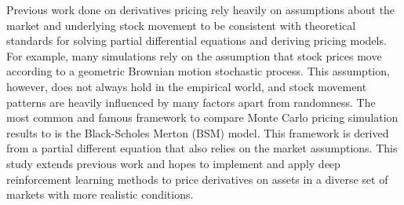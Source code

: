 % 
% 
%
Previous work done on derivatives pricing rely heavily on assumptions about the market and underlying stock movement to be consistent with theoretical standards for solving partial differential equations and deriving pricing models. For example, many simulations rely on the assumption that stock prices move according to a geometric Brownian motion stochastic process. This assumption, however, does not always hold in the empirical world, and stock movement patterns are heavily influenced by many factors apart from randomness. The most common and famous framework to compare Monte Carlo pricing simulation results to is the Black-Scholes Merton (BSM) model. This framework is derived from a partial different equation that also relies on the market assumptions. This study extends previous work and hopes to implement and apply deep reinforcement learning methods to price derivatives on assets in a diverse set of markets with more realistic conditions.